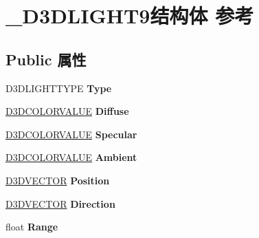 \hypertarget{struct___d3_d_l_i_g_h_t9}{}\section{\+\_\+\+D3\+D\+L\+I\+G\+H\+T9结构体 参考}
\label{struct___d3_d_l_i_g_h_t9}
\subsection*{Public 属性}
\begin{DoxyCompactItemize}
\item 
\mbox{\label{struct___d3_d_l_i_g_h_t9_a75aa4c88ff862b887412ec57a89b8d05}} 
D3\+D\+L\+I\+G\+H\+T\+T\+Y\+PE {\bfseries Type}
\item 
\mbox{\label{struct___d3_d_l_i_g_h_t9_aa808212a707abd22fc12ccc5686532d8}} 
\hyperlink{struct___d3_d_c_o_l_o_r_v_a_l_u_e}{D3\+D\+C\+O\+L\+O\+R\+V\+A\+L\+UE} {\bfseries Diffuse}
\item 
\mbox{\label{struct___d3_d_l_i_g_h_t9_a60a3bd9682ff729c2edf232957f76810}} 
\hyperlink{struct___d3_d_c_o_l_o_r_v_a_l_u_e}{D3\+D\+C\+O\+L\+O\+R\+V\+A\+L\+UE} {\bfseries Specular}
\item 
\mbox{\label{struct___d3_d_l_i_g_h_t9_a86ac41d8f4842cd7b3c96ade6d42e362}} 
\hyperlink{struct___d3_d_c_o_l_o_r_v_a_l_u_e}{D3\+D\+C\+O\+L\+O\+R\+V\+A\+L\+UE} {\bfseries Ambient}
\item 
\mbox{\label{struct___d3_d_l_i_g_h_t9_a453c14f24bffdd943c04f476a7f228a3}} 
\hyperlink{struct___d3_d_v_e_c_t_o_r}{D3\+D\+V\+E\+C\+T\+OR} {\bfseries Position}
\item 
\mbox{\label{struct___d3_d_l_i_g_h_t9_abafebff683306c364a749c846e892d6b}} 
\hyperlink{struct___d3_d_v_e_c_t_o_r}{D3\+D\+V\+E\+C\+T\+OR} {\bfseries Direction}
\item 
\mbox{\label{struct___d3_d_l_i_g_h_t9_a875f3c04ba7cf6b367b48caad5f7f7a8}} 
float {\bfseries Range}
\item 
\mbox{\label{struct___d3_d_l_i_g_h_t9_a1b823a66817d162d9e79c3b9959fc987}} 

\end{DoxyCompactItemize}
